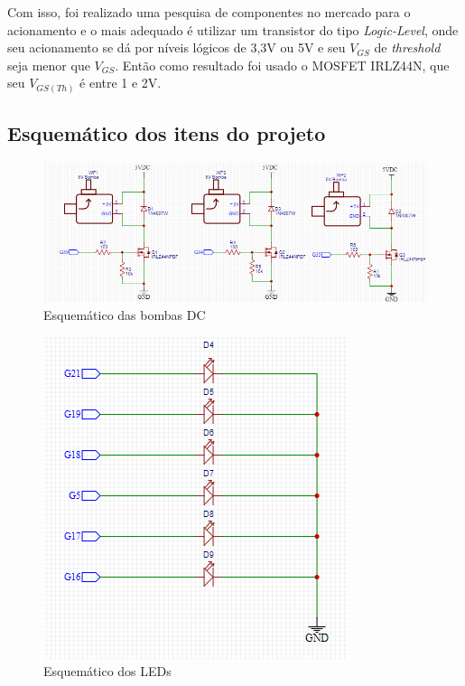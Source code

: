 Com isso, foi realizado uma pesquisa de componentes no mercado para o acionamento e o mais adequado é utilizar um transistor do tipo \textit{Logic-Level}, onde seu acionamento se dá por níveis lógicos de 3,3V ou 5V e seu $V_{GS}$ de \textit{threshold} seja menor que $V_{GS}$. Então como resultado foi usado o MOSFET IRLZ44N, que seu $V_{GS(Th)}$ é entre 1 e 2V.


\subsection{Esquemático dos itens do projeto}

\begin{figure}[h]
	\centering
	\label{fig:motor_esquema}
		\includegraphics[keepaspectratio=true,scale=0.6]{figuras/motores.png}
	\caption{Esquemático das bombas DC}
\end{figure}

\begin{figure}[h]
	\centering
	\label{fig:LEDs_esquema}
		\includegraphics[keepaspectratio=true,scale=0.8]{figuras/leds.png}
	\caption{Esquemático dos LEDs}
\end{figure}

